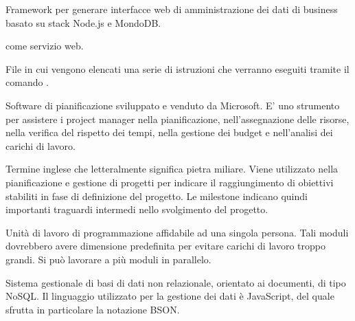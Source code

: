 \begin{itemize}


Framework per generare interfacce web di amministrazione dei dati di business basato su stack Node.js e MondoDB.


\ProjectName come servizio web.


File in cui vengono elencati una serie di istruzioni che verranno eseguiti tramite il comando .





Software di pianificazione sviluppato e venduto da Microsoft. E'  uno strumento per assistere i project manager nella pianificazione, nell'assegnazione delle risorse, nella verifica del rispetto dei tempi, nella gestione dei budget e nell'analisi dei carichi di lavoro.


Termine inglese che letteralmente significa pietra miliare. Viene utilizzato nella pianificazione e gestione di progetti per indicare il raggiungimento di obiettivi stabiliti in fase di definizione del progetto. 
Le milestone indicano quindi importanti traguardi intermedi nello svolgimento del progetto.


Unità di lavoro di programmazione affidabile ad una singola persona. Tali moduli dovrebbero avere dimensione predefinita per evitare carichi di lavoro troppo grandi. Si può lavorare a più moduli in parallelo.


Sistema gestionale di basi di dati non relazionale, orientato ai documenti, di tipo NoSQL. Il linguaggio utilizzato per la gestione dei dati è JavaScript, del quale sfrutta in particolare la notazione BSON.


\end{itemize}


